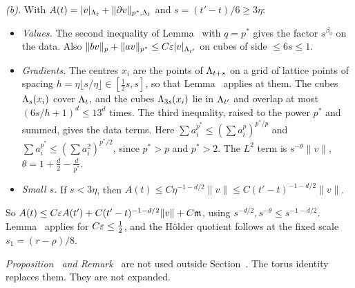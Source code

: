 \begin{detail}
\emph{(b).} With $A(t)=|v|_{\Lambda_t}+\|\partial v\|_{p^*,\Lambda_t}$ and $s=(t'-t)/6\ge3\eta$:
\begin{itemize}
\item \emph{Values.} The second inequality of Lemma~ with $q=p^*$ gives the factor $s^{\beta_0}$ on the data. Also $\|bv\|_p+\|av\|_{p^*}\le C\varepsilon|v|_{\Lambda_{t'}}$ on cubes of side $\le6s\le1$.
\item \emph{Gradients.} The centres $x_i$ are the points of $\Lambda_{t+s}$ on a grid of lattice points of spacing $h=\eta\lfloor s/\eta\rfloor\in[\frac12s,s]$, so that Lemma~ applies at them. The cubes $\Lambda_s(x_i)$ cover $\Lambda_t$, and the cubes $\Lambda_{3s}(x_i)$ lie in $\Lambda_{t'}$ and overlap at most $(6s/h+1)^d\le13^d$ times. The third inequality, raised to the power $p^*$ and summed, gives the data terms. Here $\sum a_i^{p^*}\le(\sum a_i^p)^{p^*/p}$ and $\sum a_i^{p^*}\le(\sum a_i^2)^{p^*/2}$, since $p^*>p$ and $p^*>2$. The $L^2$ term is $s^{-\theta}\|v\|$, $\theta=1+\frac d2-\frac d{p^*}$.
\item \emph{Small $s$.} If $s<3\eta$, then $A(t)\le C\eta^{-1-d/2}\|v\|\le C(t'-t)^{-1-d/2}\|v\|$.
\end{itemize}
So $A(t)\le C\varepsilon A(t')+C(t'-t)^{-1-d/2}\|v\|+C\mathfrak m$, using $s^{-d/2},s^{-\theta}\le s^{-1-d/2}$. Lemma~ applies for $C\varepsilon\le\frac12$, and the H\"older quotient follows at the fixed scale $s_1=(r-\rho)/8$.

\emph{Proposition~ and Remark~} are not used outside Section~. The torus identity  replaces them. They are not expanded.
\end{detail}

